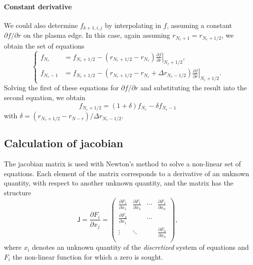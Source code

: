 \documentclass{notes}
\newcommand{\Jac}{\mathsf{J}}
\begin{document}
    \paragraph{Constant derivative}
    We could also determine $f_{k+1,i,j}$ by interpolating in $f$, assuming a
    constant $\partial f/\partial r$ on the plasma edge. In this case, again
    assuming $r_{N_r+1} = r_{N_r+1/2}$, we obtain the set of equations
    \begin{equation}
        \begin{cases}
            f_{N_r} &= f_{N_r+1/2} - \left( r_{N_r+1/2}-r_{N_r} \right)\left.\frac{\partial f}{\partial r}\right|_{N_r+1/2},\\
            f_{N_r-1} &= f_{N_r+1/2} - \left( r_{N_r+1/2}-r_{N_r} + \Delta r_{N_r-1/2} \right)\left.\frac{\partial f}{\partial r}\right|_{N_r+1/2}.
        \end{cases}
    \end{equation}
    Solving the first of these equations for $\partial f/\partial r$ and
    substituting the result into the second equation, we obtain
    \begin{equation}
        f_{N_r+1/2} = \left( 1 + \delta\right) f_{N_r} - \delta f_{N_r-1}
    \end{equation}
    with $\delta = (r_{N_r+1/2}-r_{N-r})/\Delta r_{N_r-1/2}$.

    \subsection{Calculation of jacobian}
    The jacobian matrix is used with Newton's method to solve a non-linear set
    of equations. Each element of the matrix corresponds to a derivative of an
    unknown quantity, with respect to another unknown quantity, and the matrix
    has the structure
    \begin{equation}
        \Jac = \frac{\partial F_i}{\partial x_j} = \begin{pmatrix}
            \frac{\partial F_1}{\partial x_1} & \frac{\partial F_1}{\partial x_2} & \cdots & \frac{\partial F_1}{\partial x_n}\\
            \frac{\partial F_2}{\partial x_1} & & \cdots & \\
            \vdots & \ddots & & \frac{\partial F_n}{\partial x_n} \\
        \end{pmatrix},
    \end{equation}
    where $x_i$ denotes an unknown quantity of the {\em discretized} system of
    equations and $F_i$ the non-linear function for which a zero is sought.
\end{document}
